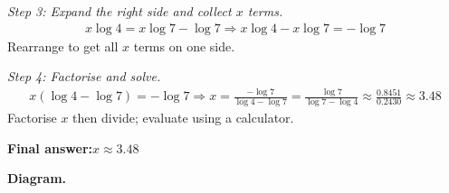 \documentclass[11pt]{article}
\begin{document}
\textit{Step 3: Expand the right side and collect \( x \) terms.}
\[\begin{gathered}
x\log 4 = x\log 7 - \log 7 \Rightarrow x\log 4 - x\log 7 = -\log 7
\end{gathered}\]
Rearrange to get all \( x \) terms on one side.

\textit{Step 4: Factorise and solve.}
\[\begin{gathered}
x(\log 4 - \log 7) = -\log 7 \Rightarrow x = \frac{-\log 7}{\log 4 - \log 7} = \frac{\log 7}{\log 7 - \log 4} \approx \frac{0.8451}{0.2430} \approx 3.48
\end{gathered}\]
Factorise \( x \) then divide; evaluate using a calculator.

\begin{answerbox}
\textbf{Final answer:}\quad \(\displaystyle  x \approx 3.48 \)
\end{answerbox}
\textbf{Diagram.}
\end{document}
